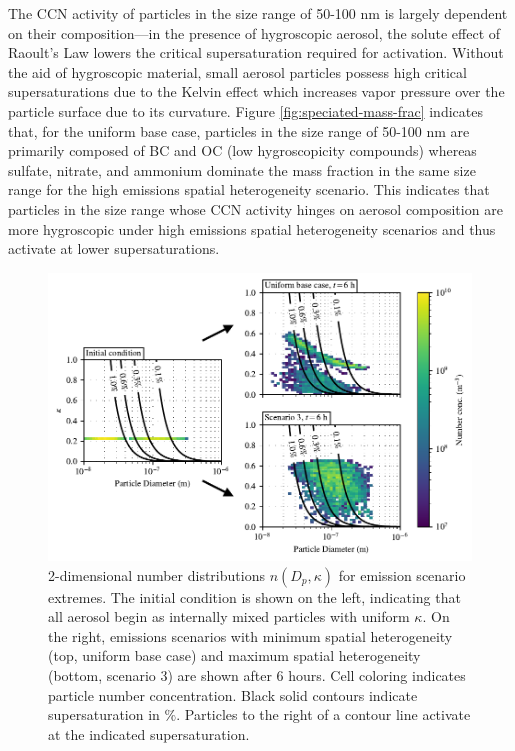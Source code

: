 \documentclass[journal abbreviation, manuscript]{copernicus}
\begin{document}
The CCN activity of particles in the size range of 50-100 nm is largely dependent on their composition---in the presence of hygroscopic aerosol, the solute effect of Raoult's Law lowers the critical supersaturation required for activation. Without the aid of hygroscopic material, small aerosol particles possess high critical supersaturations due to the Kelvin effect which increases vapor pressure over the particle surface due to its curvature. Figure \ref{fig:speciated-mass-frac} indicates that, for the uniform base case, particles in the size range of 50-100 nm are primarily composed of BC and OC (low hygroscopicity compounds) whereas sulfate, nitrate, and ammonium dominate the mass fraction in the same size range for the high emissions spatial heterogeneity scenario. This indicates that particles in the size range whose CCN activity hinges on aerosol composition are more hygroscopic under high emissions spatial heterogeneity scenarios and thus activate at lower supersaturations.

\begin{figure}[!t]
	\centering
	\includegraphics[]{figures/2d-kappa-dist-three-panel-z40.pdf}
	\caption{2-dimensional number distributions $n(D_p, \kappa)$ for emission scenario extremes. The initial condition is shown on the left, indicating that all aerosol begin as internally mixed particles with uniform $\kappa$. On the right, emissions scenarios with minimum spatial heterogeneity (top, uniform base case) and maximum spatial heterogeneity (bottom, scenario 3) are shown after 6 hours. Cell coloring indicates particle number concentration. Black solid contours indicate supersaturation in $\%$. Particles to the right of a contour line activate at the indicated supersaturation.}
	\label{fig:kappa-dist}
\end{figure} 
\end{document}
